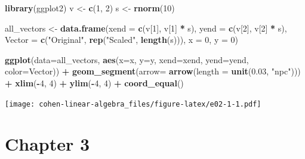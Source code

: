 \documentclass[
]{book}
\newenvironment{Shaded}{\begin{snugshade}}{\end{snugshade}}
\newcommand{\DataTypeTok}[1]{\textcolor[rgb]{0.13,0.29,0.53}{#1}}
\newcommand{\DecValTok}[1]{\textcolor[rgb]{0.00,0.00,0.81}{#1}}
\newcommand{\FloatTok}[1]{\textcolor[rgb]{0.00,0.00,0.81}{#1}}
\newcommand{\KeywordTok}[1]{\textcolor[rgb]{0.13,0.29,0.53}{\textbf{#1}}}
\newcommand{\NormalTok}[1]{#1}
\newcommand{\OperatorTok}[1]{\textcolor[rgb]{0.81,0.36,0.00}{\textbf{#1}}}
\newcommand{\StringTok}[1]{\textcolor[rgb]{0.31,0.60,0.02}{#1}}
\begin{document}
\begin{Shaded}
\begin{Highlighting}[]
\KeywordTok{library}\NormalTok{(ggplot2)}
\NormalTok{v \textless{}{-}}\StringTok{ }\KeywordTok{c}\NormalTok{(}\DecValTok{1}\NormalTok{, }\DecValTok{2}\NormalTok{)}
\NormalTok{s \textless{}{-}}\StringTok{ }\KeywordTok{rnorm}\NormalTok{(}\DecValTok{10}\NormalTok{)}

\NormalTok{all\_vectors \textless{}{-}}\StringTok{ }\KeywordTok{data.frame}\NormalTok{(}\DataTypeTok{xend =} \KeywordTok{c}\NormalTok{(v[}\DecValTok{1}\NormalTok{], v[}\DecValTok{1}\NormalTok{] }\OperatorTok{*}\StringTok{ }\NormalTok{s),}
                          \DataTypeTok{yend =} \KeywordTok{c}\NormalTok{(v[}\DecValTok{2}\NormalTok{], v[}\DecValTok{2}\NormalTok{] }\OperatorTok{*}\StringTok{ }\NormalTok{s),}
                          \DataTypeTok{Vector =} \KeywordTok{c}\NormalTok{(}\StringTok{"Original"}\NormalTok{, }\KeywordTok{rep}\NormalTok{(}\StringTok{"Scaled"}\NormalTok{, }\KeywordTok{length}\NormalTok{(s))),}
                          \DataTypeTok{x =} \DecValTok{0}\NormalTok{,}
                          \DataTypeTok{y =} \DecValTok{0}\NormalTok{)}

\KeywordTok{ggplot}\NormalTok{(}\DataTypeTok{data=}\NormalTok{all\_vectors, }\KeywordTok{aes}\NormalTok{(}\DataTypeTok{x=}\NormalTok{x, }\DataTypeTok{y=}\NormalTok{y, }\DataTypeTok{xend=}\NormalTok{xend, }\DataTypeTok{yend=}\NormalTok{yend, }\DataTypeTok{color=}\NormalTok{Vector)) }\OperatorTok{+}\StringTok{ }
\StringTok{  }\KeywordTok{geom\_segment}\NormalTok{(}\DataTypeTok{arrow=} \KeywordTok{arrow}\NormalTok{(}\DataTypeTok{length =} \KeywordTok{unit}\NormalTok{(}\FloatTok{0.03}\NormalTok{, }\StringTok{"npc"}\NormalTok{))) }\OperatorTok{+}
\StringTok{  }\KeywordTok{xlim}\NormalTok{(}\OperatorTok{{-}}\DecValTok{4}\NormalTok{, }\DecValTok{4}\NormalTok{) }\OperatorTok{+}
\StringTok{  }\KeywordTok{ylim}\NormalTok{(}\OperatorTok{{-}}\DecValTok{4}\NormalTok{, }\DecValTok{4}\NormalTok{) }\OperatorTok{+}\StringTok{ }
\StringTok{  }\KeywordTok{coord\_equal}\NormalTok{()}
\end{Highlighting}
\end{Shaded}

\texttt{[image: cohen-linear-algebra\_files/figure-latex/e02-1-1.pdf]}

\hypertarget{chapter-3-1}{%
\section*{Chapter 3}\label{chapter-3-1}}
\end{document}
